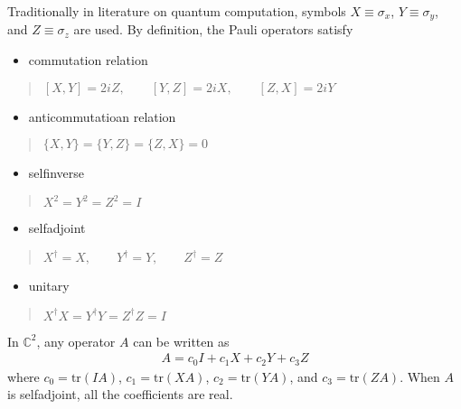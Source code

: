 \documentclass[letterpaper,10pt,english]{jupyterBook}
\begin{document}
\sphinxAtStartPar
Traditionally in literature on quantum computation, symbols \(X\equiv \sigma_x\), \(Y\equiv \sigma_y\), and \(Z\equiv \sigma_z\) are used.  By definition, the Pauli operators satisfy
\begin{itemize}
\item {}
\sphinxAtStartPar
commutation relation

\end{itemize}
\begin{quote}

\sphinxAtStartPar
\([X,Y]=2 i Z, \qquad [Y,Z]=2 i X, \qquad [Z,X]=2 i Y\)
\end{quote}
\begin{itemize}
\item {}
\sphinxAtStartPar
anti\sphinxhyphen{}commutatioan relation

\end{itemize}
\begin{quote}

\sphinxAtStartPar
\(\{X,Y\} = \{Y,Z\} = \{Z,X\} = 0\)
\end{quote}
\begin{itemize}
\item {}
\sphinxAtStartPar
self\sphinxhyphen{}inverse

\end{itemize}
\begin{quote}

\sphinxAtStartPar
\(X^2 = Y^2 = Z^2 = I\)
\end{quote}
\begin{itemize}
\item {}
\sphinxAtStartPar
self\sphinxhyphen{}adjoint

\end{itemize}
\begin{quote}

\sphinxAtStartPar
\(X^\dagger=X, \qquad Y^\dagger=Y, \qquad Z^\dagger = Z\)
\end{quote}
\begin{itemize}
\item {}
\sphinxAtStartPar
unitary

\end{itemize}
\begin{quote}

\sphinxAtStartPar
\(X^\dagger X = Y^\dagger Y = Z^\dagger Z = I\)
\end{quote}

\sphinxAtStartPar
In \(\mathbb{C}^2\), any operator \(A\) can be written as
\begin{equation*}
\begin{split}
A = c_0 I + c_1 X + c_2 Y + c_3 Z
\end{split}
\end{equation*}
\sphinxAtStartPar
where \(c_0 = \text{tr}(I A)\), \(c_1 = \text{tr}(X A)\), \(c_2 = \text{tr}(Y A)\), and \(c_3 = \text{tr}(Z A)\).  When \(A\) is self\sphinxhyphen{}adjoint, all the coefficients are real.
\end{document}

